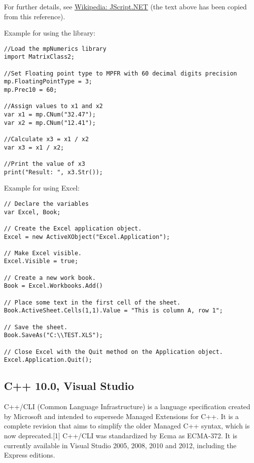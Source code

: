 For further details, see \href{http://en.wikipedia.org/wiki/JScript_.NET}{Wikipedia: JScript.NET} (the text above has been copied from this reference).

\noindent Example for using the library:

\begin{lstlisting}
//Load the mpNumerics library
import MatrixClass2;

//Set Floating point type to MPFR with 60 decimal digits precision
mp.FloatingPointType = 3;
mp.Prec10 = 60;

//Assign values to x1 and x2
var x1 = mp.CNum("32.47");
var x2 = mp.CNum("12.41");

//Calculate x3 = x1 / x2
var x3 = x1 / x2;

//Print the value of x3
print("Result: ", x3.Str());
\end{lstlisting}



\noindent Example for using Excel:

\begin{lstlisting}
// Declare the variables
var Excel, Book;

// Create the Excel application object.
Excel = new ActiveXObject("Excel.Application");

// Make Excel visible.
Excel.Visible = true;

// Create a new work book.
Book = Excel.Workbooks.Add()

// Place some text in the first cell of the sheet.
Book.ActiveSheet.Cells(1,1).Value = "This is column A, row 1";

// Save the sheet.
Book.SaveAs("C:\\TEST.XLS");

// Close Excel with the Quit method on the Application object.
Excel.Application.Quit();
\end{lstlisting}







\newpage
\subsection{C++ 10.0, Visual Studio}
C++/CLI (Common Language Infrastructure) is a language specification created by Microsoft and intended to supersede Managed Extensions for C++. It is a complete revision that aims to simplify the older Managed C++ syntax, which is now deprecated.[1] C++/CLI was standardized by Ecma as ECMA-372. It is currently available in Visual Studio 2005, 2008, 2010 and 2012, including the Express editions.

